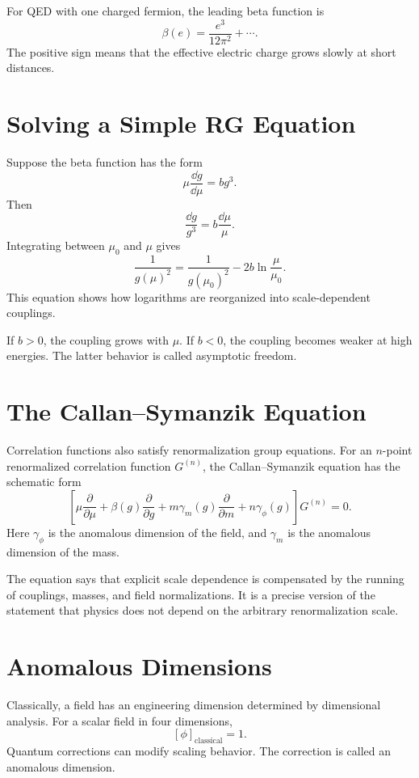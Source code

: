For QED with one charged fermion, the leading beta function is
\[
    \beta(e)=\frac{e^3}{12\pi^2}+\cdots.
\]
The positive sign means that the effective electric charge grows slowly at short
distances.

\section{Solving a Simple RG Equation}

Suppose the beta function has the form
\[
    \mu\frac{\dd g}{\dd\mu}=b g^3.
\]
Then
\[
    \frac{\dd g}{g^3}=b\frac{\dd\mu}{\mu}.
\]
Integrating between \(\mu_0\) and \(\mu\) gives
\[
    \frac{1}{g(\mu)^2}
    = \frac{1}{g(\mu_0)^2}-2b\ln\frac{\mu}{\mu_0}.
\]
This equation shows how logarithms are reorganized into scale-dependent
couplings.

If \(b>0\), the coupling grows with \(\mu\). If \(b<0\), the coupling becomes
weaker at high energies. The latter behavior is called asymptotic freedom.

\section{The Callan--Symanzik Equation}

Correlation functions also satisfy renormalization group equations. For an
\(n\)-point renormalized correlation function \(G^{(n)}\), the
Callan--Symanzik equation has the schematic form
\[
    \left[
      \mu\frac{\partial}{\partial\mu}
      +\beta(g)\frac{\partial}{\partial g}
      +m\gamma_m(g)\frac{\partial}{\partial m}
      +n\gamma_\phi(g)
    \right]G^{(n)}=0.
\]
Here \(\gamma_\phi\) is the anomalous dimension of the field, and
\(\gamma_m\) is the anomalous dimension of the mass.

The equation says that explicit scale dependence is compensated by the running
of couplings, masses, and field normalizations. It is a precise version of the
statement that physics does not depend on the arbitrary renormalization scale.

\section{Anomalous Dimensions}

Classically, a field has an engineering dimension determined by dimensional
analysis. For a scalar field in four dimensions,
\[
    [\phi]_{\mathrm{classical}}=1.
\]
Quantum corrections can modify scaling behavior. The correction is called an
anomalous dimension.

